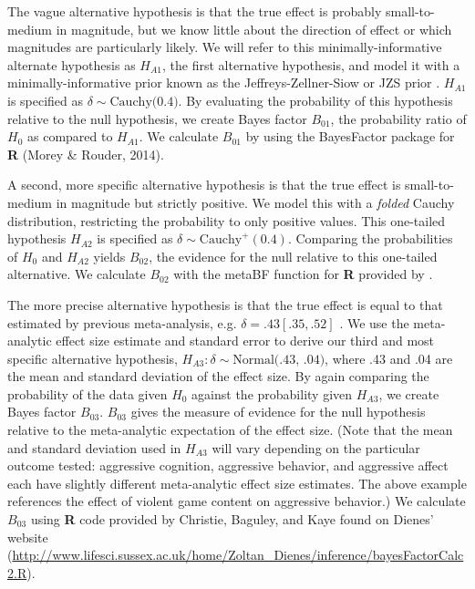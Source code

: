 \documentclass[man]{apa6}
\begin{document}
The vague alternative hypothesis is that the true effect is probably small-to-medium in magnitude, but we know little about the direction of effect or which magnitudes are particularly likely. We will refer to this minimally-informative alternate hypothesis as $H_{A1}$, the first alternative hypothesis, and model it with a minimally-informative prior known as the Jeffreys-Zellner-Siow or JZS prior \citep[see ][]{Jeffreys:1961,Liang:etal:2008,Rouder:etal:2009a,Zellner:Siow:1980}. %
$H_{A1}$ is specified as $\delta \sim \mbox{Cauchy(0.4)}$. By evaluating the probability of this hypothesis relative to the null hypothesis, we create Bayes factor $B_{01}$, the probability ratio of $H_0$ as compared to $H_{A1}$. We calculate $B_{01}$ by using the BayesFactor package for \textbf{R} (Morey \& Rouder, 2014).  

A second, more specific alternative hypothesis is that the true effect is small-to-medium in magnitude but strictly positive. We model this with a {\em folded} Cauchy distribution, restricting the probability to only positive values. This one-tailed hypothesis $H_{A2}$ is specified as $\delta \sim \mbox{Cauchy}^{+}(0.4)$. Comparing the probabilities of $H_0$ and $H_{A2}$ yields $B_{02}$, the evidence for the null relative to this one-tailed alternative. We calculate $B_{02}$ with the metaBF function for \textbf{R} provided by \citet{Rouder:Morey:2011}.

The more precise alternative hypothesis is that the true effect is equal to that estimated by previous meta-analysis, e.g. $\delta = .43 [.35, .52]$ \citep{Anderson:etal:2010}.  We use the meta-analytic effect size estimate and standard error to derive our third and most specific alternative hypothesis, $H_{A3}: \delta \sim{} \mbox{Normal(.43, .04)}$, where .43 and .04 are the mean and standard deviation of the effect size. 
By again comparing the probability of the data given $H_0$ against the probability given $H_{A3}$, we create Bayes factor $B_{03}$. $B_{03}$ gives the measure of evidence for the null hypothesis relative to the meta-analytic expectation of the effect size. (Note that the mean and standard deviation used in $H_{A3}$ will vary depending on the particular outcome tested: aggressive cognition, aggressive behavior, and aggressive affect each have slightly different meta-analytic effect size estimates. The above example references the effect of violent game content on aggressive behavior.)
We calculate $B_{03}$ using {\bf R} code provided by Christie, Baguley, and Kaye found on Dienes' website (\url{http://www.lifesci.sussex.ac.uk/home/Zoltan_Dienes/inference/bayesFactorCalc2.R}).  %
\end{document}
